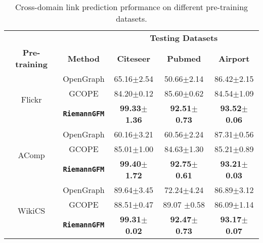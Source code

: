 


\begin{table}[t]
    \caption{Cross-domain link prediction prformance on different pre-training datasets.}
    \vspace{-0.1in}
    \label{tab:diff-train-lp}
    \centering
    \begin{tabular}{c  c | cc  c  }
    \hline
    & & \multicolumn{3}{c}{\textbf{Testing Datasets}}\\
    \textbf{Pre-training} & \textbf{Method}  & \textbf{Citeseer} & \textbf{Pubmed}  & \textbf{Airport}  \\
    \hline
    \multirow{3}{*}{Flickr}
    & OpenGraph 
    & 65.16\scriptsize{$\pm$2.54} 
    & 50.66\scriptsize{$\pm$2.14} 
    & 86.42\scriptsize{$\pm$2.15} \\
    & GCOPE &  84.20\scriptsize{$\pm$0.12} &85.60\scriptsize{$\pm$0.62} & 84.54\scriptsize{$\pm$1.09} \\
    & \textbf{\texttt{RiemannGFM}}  &\textbf{99.33\scriptsize{$\pm$1.36} }&\textbf{92.51\scriptsize{$\pm$0.73} }& \textbf{93.52\scriptsize{$\pm$0.06}} \\
    \hline
    \multirow{3}{*}{AComp}
    & OpenGraph 
    & 60.16\scriptsize{$\pm$3.21} 
    & 60.56\scriptsize{$\pm$2.24} 
    & 87.31\scriptsize{$\pm$0.56} \\
    & GCOPE &   85.01\scriptsize{$\pm$1.00} &84.63\scriptsize{$\pm$1.30} & 85.21\scriptsize{$\pm$0.89} \\
    & \textbf{\texttt{RiemannGFM}}  & \textbf{99.40\scriptsize{$\pm$1.72}} & \textbf{92.75\scriptsize{$\pm$0.61}} & \textbf{93.21\scriptsize{$\pm$0.03} }\\
    \hline
    \multirow{3}{*}{WikiCS}
    & OpenGraph 
    & 89.64\scriptsize{$\pm$3.45} 
    & 72.24\scriptsize{$\pm$4.24} 
    & 86.89\scriptsize{$\pm$3.12} \\
    & GCOPE &   88.51\scriptsize{$\pm$0.47} &89.07 \scriptsize{$\pm$0.58} & 86.09\scriptsize{$\pm$1.14} \\
    & \textbf{\texttt{RiemannGFM}}  &  \textbf{99.31\scriptsize{$\pm$0.02} }&\textbf{92.47\scriptsize{$\pm$0.73}} & \textbf{93.17\scriptsize{$\pm$0.07}} \\
    \hline
    \end{tabular}
        \vspace{-0.12in}
    \end{table}


